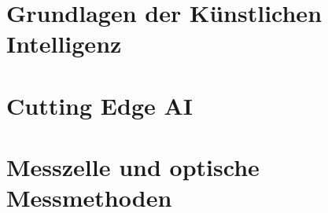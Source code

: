 \section{Grundlagen der Künstlichen Intelligenz}


\section{Cutting Edge AI}


\section{Messzelle und optische Messmethoden}
